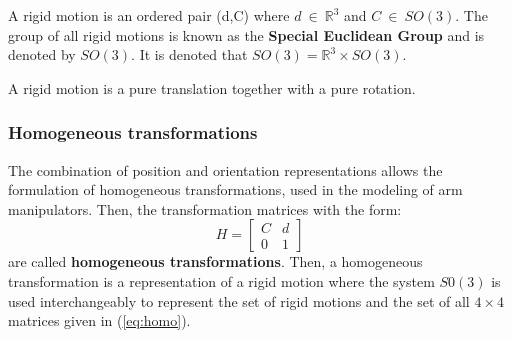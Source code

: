  \begin{definition}
   A rigid motion is an ordered pair (d,C) where $d\ \in\ \mathbb{R}^3$ and $C\ \in\ SO(3)$. The group of all rigid motions is known as the \textbf{Special Euclidean Group} and is denoted by $SO(3)$. It is denoted that $SO(3)=\mathbb{R}^3\times SO(3)$.
 \end{definition}

 A rigid motion is a pure translation together with a pure rotation.

 \subsubsection{Homogeneous transformations}

 The combination of position and orientation representations allows the formulation of homogeneous transformations, used in the modeling of arm manipulators. Then, the transformation matrices with the form:
 \begin{equation}\label{eq:homo}
   H=\left[\begin{array}{cc}
             C & d \\
             0 & 1 \end{array}\right]
 \end{equation} are called \textbf{homogeneous transformations}. Then, a homogeneous transformation is a representation of a rigid motion where the system $S0(3)$ is used interchangeably to represent the set of rigid motions and the set of all $4\times4$ matrices given in (\ref{eq:homo}).

